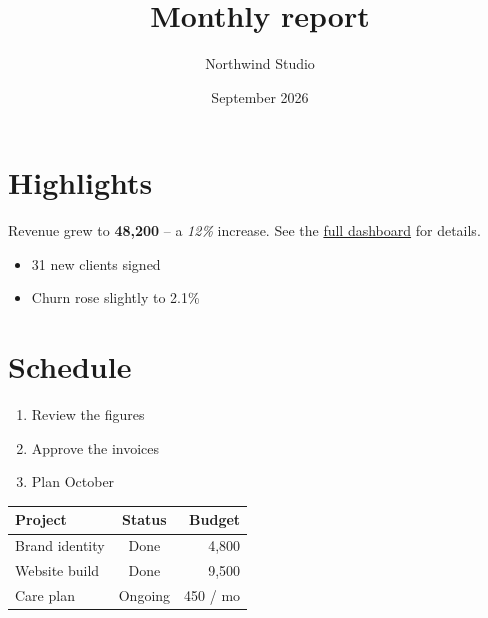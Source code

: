 \documentclass{article}
\title{Monthly report}
\author{Northwind Studio}
\date{September 2026}
\begin{document}
\maketitle

\section{Highlights}
Revenue grew to \textbf{\texteuro{}48,200} -- a \emph{12\%} increase. See the
\href{https://example.com}{full dashboard} for details.

\begin{itemize}
\item 31 new clients signed
\item Churn rose slightly to 2.1\%
\end{itemize}

\section{Schedule}
\begin{enumerate}
\item Review the figures
\item Approve the invoices
\item Plan October
\end{enumerate}

\begin{tabular}{lcr}
Project & Status & Budget \\ \hline
Brand identity & Done & 4,800 \\
Website build & Done & 9,500 \\
Care plan & Ongoing & 450 / mo \\
\end{tabular}
\end{document}
